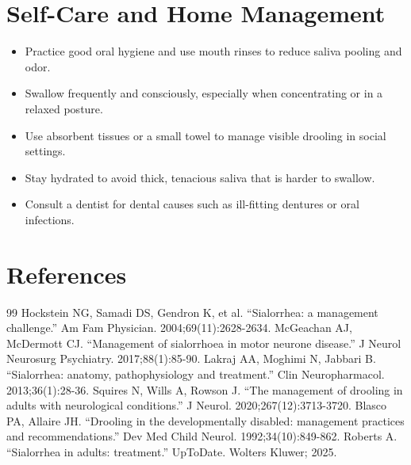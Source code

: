 \section*{Self-Care and Home Management}
\begin{itemize}
  \item Practice good oral hygiene and use mouth rinses to reduce saliva pooling and odor.
  \item Swallow frequently and consciously, especially when concentrating or in a relaxed posture.
  \item Use absorbent tissues or a small towel to manage visible drooling in social settings.
  \item Stay hydrated to avoid thick, tenacious saliva that is harder to swallow.
  \item Consult a dentist for dental causes such as ill-fitting dentures or oral infections.
\end{itemize}

\section*{References}
\begin{thebibliography}{99}
 Hockstein NG, Samadi DS, Gendron K, et al. ``Sialorrhea: a management challenge.'' Am Fam Physician. 2004;69(11):2628-2634.
 McGeachan AJ, McDermott CJ. ``Management of sialorrhoea in motor neurone disease.'' J Neurol Neurosurg Psychiatry. 2017;88(1):85-90.
 Lakraj AA, Moghimi N, Jabbari B. ``Sialorrhea: anatomy, pathophysiology and treatment.'' Clin Neuropharmacol. 2013;36(1):28-36.
 Squires N, Wills A, Rowson J. ``The management of drooling in adults with neurological conditions.'' J Neurol. 2020;267(12):3713-3720.
 Blasco PA, Allaire JH. ``Drooling in the developmentally disabled: management practices and recommendations.'' Dev Med Child Neurol. 1992;34(10):849-862.
 Roberts A. ``Sialorrhea in adults: treatment.'' UpToDate. Wolters Kluwer; 2025.
\end{thebibliography}
